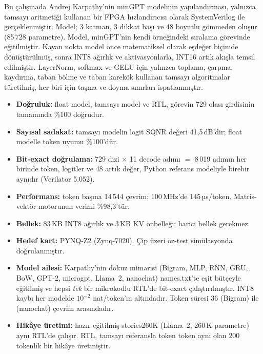 Bu çalışmada Andrej Karpathy'nin minGPT modelinin  yapılandırması, yalnızca tamsayı aritmetiği kullanan bir FPGA hızlandırıcısı olarak SystemVerilog ile gerçeklenmiştir. Model; 3 katman, 3 dikkat başı ve 48 boyutlu gömmeden oluşur (85\,728 parametre). Model, minGPT'nin kendi örneğindeki sıralama görevinde eğitilmiştir. Kayan nokta model önce matematiksel olarak eşdeğer biçimde dönüştürülmüş, sonra INT8 ağırlık ve aktivasyonlarla, INT16 artık akışla temsil edilmiştir. LayerNorm, softmax ve GELU için yalnızca toplama, çarpma, kaydırma, taban bölme ve taban karekök kullanan tamsayı algoritmalar türetilmiş, her biri için taşma ve doyma sınırları ispatlanmıştır.

\medskip
\begin{ozet}
\begin{itemize}[leftmargin=12pt]
  \item \textbf{Doğruluk:} float model, tamsayı model ve RTL, görevin 729 olası girdisinin tamamında \%100 doğrudur.
  \item \textbf{Sayısal sadakat:} tamsayı modelin logit SQNR değeri 41,5\,dB'dir; float modelle token uyumu \%100'dür.
  \item \textbf{Bit-exact doğrulama:} 729 dizi $\times$ 11 decode adımı $=$ 8\,019 adımın her birinde token, logitler ve 48 artık değer, Python referans modeliyle birebir aynıdır (Verilator 5.052).
  \item \textbf{Performans:} token başına 14\,544 çevrim; 100\,MHz'de 145\,µs/token. Matris-vektör motorunun verimi \%98,3'tür.
  \item \textbf{Bellek:} 83\,KB INT8 ağırlık ve 3\,KB KV önbelleği; harici bellek gerekmez.
  \item \textbf{Hedef kart:} PYNQ-Z2 (Zynq-7020). Çip üzeri öz-test simülasyonda doğrulanmıştır.
  \item \textbf{Model ailesi:} Karpathy'nin dokuz mimarisi (Bigram, MLP, RNN, GRU, BoW, GPT-2, microgpt, Llama~2, nanochat) names.txt'te eşit bütçeyle eğitilmiş ve hepsi \emph{tek} bir mikrokodlu RTL'de bit-exact çalıştırılmıştır. INT8 kaybı her modelde $10^{-2}$ nat/token'ın altındadır. Token süresi 36 (Bigram) ile \zooNanoCyc{} (nanochat) çevrim arasındadır.
  \item \textbf{Hikâye üretimi:} hazır eğitilmiş stories260K (Llama~2, 260\,K parametre) aynı RTL'de çalışır. RTL, tamsayı referansla token token aynı olan 200 tokenlık bir hikâye üretmiştir.
\end{itemize}
\end{ozet}

